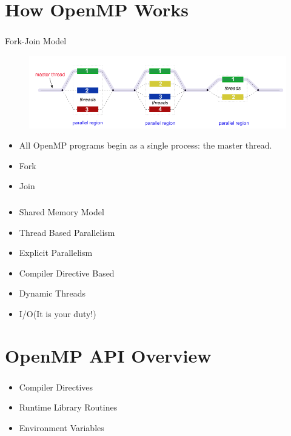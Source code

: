 \documentclass{beamer}
\begin{document}
	\section{How OpenMP Works}
	\begin{frame}
		\frametitle{\insertsection}
		\begin{block}{Fork-Join Model}
		\begin{figure}[H]
			\centering
			\includegraphics[width=\linewidth]{fork_join2.png}
		\end{figure}
		\end{block}
		\begin{itemize}
			\item All OpenMP programs begin as a single process: the master thread.
			\item Fork
			\item Join
		\end{itemize}
	\end{frame}
	\begin{frame}
		\frametitle{\insertsection}
		\begin{itemize}
			\item Shared Memory Model
			\item Thread Based Parallelism
			\item Explicit Parallelism
			\item Compiler Directive Based
			\item Dynamic Threads
			\item I/O(It is your duty!)
		\end{itemize}
	\end{frame}
	
	\section{OpenMP API Overview}
	\begin{frame}
		\frametitle{\insertsection}
		\begin{itemize}
			\item Compiler Directives
			\item Runtime Library Routines
			\item Environment Variables
		\end{itemize}
	\end{frame}
	
\end{document}
